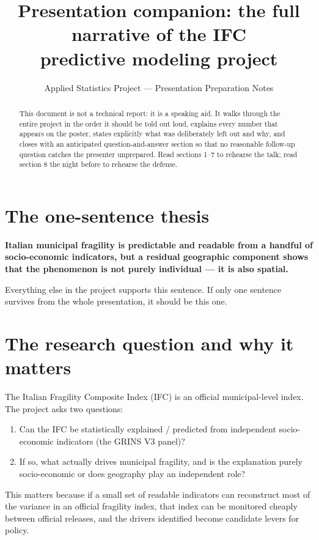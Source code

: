 \documentclass[11pt,a4paper]{article}
\title{Presentation companion: the full narrative of the IFC\\
  predictive modeling project}
\author{Applied Statistics Project --- Presentation Preparation Notes}
\date{}
\begin{document}
\maketitle

\begin{abstract}
\noindent
This document is not a technical report: it is a speaking aid. It
walks through the entire project in the order it should be told out
loud, explains every number that appears on the poster, states
explicitly what was deliberately left out and why, and closes with
an anticipated question-and-answer section so that no reasonable
follow-up question catches the presenter unprepared. Read sections
1--7 to rehearse the talk; read section 8 the night before to
rehearse the defense.
\end{abstract}

\section{The one-sentence thesis}

\textbf{Italian municipal fragility is predictable and readable from
a handful of socio-economic indicators, but a residual geographic
component shows that the phenomenon is not purely individual --- it
is also spatial.}

Everything else in the project supports this sentence. If only one
sentence survives from the whole presentation, it should be this
one.

\section{The research question and why it matters}

The Italian Fragility Composite Index (IFC) is an official
municipal-level index. The project asks two questions:

\begin{enumerate}[leftmargin=2em]
  \item Can the IFC be statistically explained / predicted from
  independent socio-economic indicators (the GRINS V3 panel)?
  \item If so, what actually drives municipal fragility, and is the
  explanation purely socio-economic or does geography play an
  independent role?
\end{enumerate}

This matters because if a small set of readable indicators can
reconstruct most of the variance in an official fragility index,
that index can be monitored cheaply between official releases, and
the drivers identified become candidate levers for policy.
\end{document}
